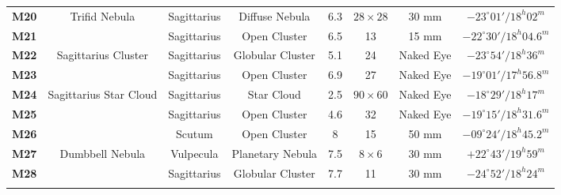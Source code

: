 \documentclass[a4paper,12pt]{extarticle}
\begin{document}
\begin{table}[H]
\begin{tabular}{cccccccc}
\textbf{M20}                             & Trifid Nebula                                                     & Sagittarius                                   & Diffuse Nebula                         & 6.3                                                                                             & $28\times 28$                                                                                   & 30 mm                                                                                       & $-23^\circ 01'/ 18^h 02^m $          \\
\rowcolor[HTML]{D9EAD3} 
\textbf{M21} &                                                                    & Sagittarius & Open Cluster      & 6.5 & 13    & 15 mm     & $-22^\circ 30' / 18^h 04.6^m$        \\
\rowcolor[HTML]{FFF2CC} 
\textbf{M22} & \multicolumn{1}{c}{\cellcolor[HTML]{FFF2CC}Sagittarius Cluster}    & Sagittarius & Globular Cluster  & 5.1 & 24    & Naked Eye & $-23^\circ 54'/ 18^h 36^m$           \\
\rowcolor[HTML]{D9EAD3} 
\textbf{M23} &                                                                    & Sagittarius & Open Cluster      & 6.9   & 27    & Naked Eye & $-19^\circ 01'/ 17^h 56.8^m$         \\
\rowcolor[HTML]{FFFFFF} 
\textbf{M24} & \multicolumn{1}{c}{\cellcolor[HTML]{FFFFFF}Sagittarius Star Cloud} & Sagittarius & Star Cloud        & 2.5 & $90\times 60$  & Naked Eye & $-18^\circ 29' / 18^h 17^m$          \\
\rowcolor[HTML]{D9EAD3} 
\textbf{M25} &                                                                    & Sagittarius & Open Cluster      & 4.6 & 32    & Naked Eye & $-19^\circ 15'/ 18^h 31.6^m$         \\
\rowcolor[HTML]{D9EAD3} 
\textbf{M26} &                                                                    & Scutum      & Open Cluster      & 8   & 15    & 50 mm     & $-09^\circ 24' / 18^h 45.2^m$        \\
\rowcolor[HTML]{D0E0E3} 
\textbf{M27} & \multicolumn{1}{c}{\cellcolor[HTML]{D0E0E3}Dumbbell Nebula}        & Vulpecula   & Planetary Nebula  & 7.5   & $8\times6$    & 30 mm     & $+22^\circ 43'/ 19^h 59^m$           \\
\rowcolor[HTML]{FFF2CC} 
\textbf{M28} &                                                                    & Sagittarius & Globular Cluster  & 7.7 & 11    & 30 mm     & $-24^\circ 52'/ 18^h 24^m$           \\
\rowcolor[HTML]{D9EAD3} 

\end{tabular}
\end{table}
\end{document}
